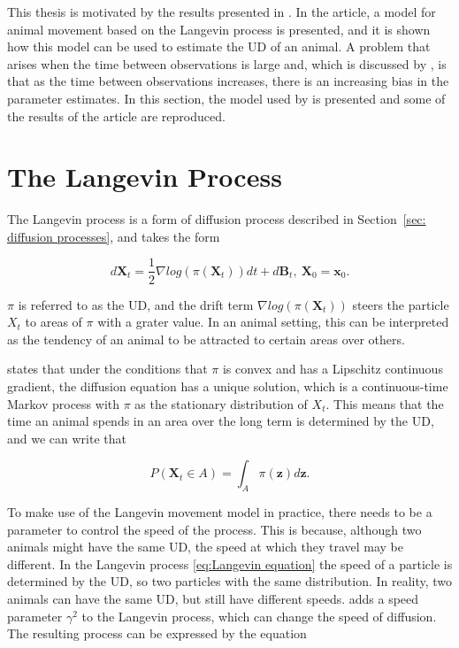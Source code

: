 
This thesis is motivated by the results presented in \parencite{michelot_langevin_2019}. In the article, a model for animal movement based on the Langevin process is presented, and it is shown how this model can be used to estimate the UD of an animal. A problem that arises when the time between observations is large and, which is discussed by \parencite{michelot_langevin_2019}, is that as the time between observations increases, there is an increasing bias in the parameter estimates. In this section, the model used by \parencite{michelot_langevin_2019} is presented and some of the results of the article are reproduced.



\section{The Langevin Process}
The Langevin process is a form of diffusion process described in Section~\ref{sec: diffusion processes}, and takes the form

\begin{equation}
    d\textbf{X}_t = \frac{1}{2} \nabla log(\pi(\textbf{X}_t))dt + d\textbf{B}_t, \ \textbf{X}_0 = \textbf{x}_0.
    \label{eq:Langevin equation}
\end{equation}


$\pi$ is referred to as the UD, and the drift term $\nabla log(\pi(\textbf{X}_t))$ steers the particle $X_t$ to areas of $\pi$ with a grater value. In an animal setting, this can be interpreted as the tendency of an animal to be attracted to certain areas over others.



\parencite{dalalyan_theoretical_2017} states that under the conditions that $\pi$ is convex and has a Lipschitz continuous gradient, the diffusion equation has a unique solution, which is a continuous-time Markov process with $\pi$ as the stationary distribution of $X_t$. This means that the time an animal spends in an area over the long term is determined by the UD, and we can write that

\begin{equation}
    P(\textbf{X}_t \in A ) = \int_A \pi(\textbf{z})d\textbf{z}.
\end{equation}


To make use of the Langevin movement model in practice, there needs to be a parameter to control the speed of the process. This is because, although two animals might have the same UD, the speed at which they travel may be different. In the Langevin process \eqref{eq:Langevin equation} the speed of a particle is determined by the UD, so two particles with the same distribution. In reality, two animals can have the same UD, but still have different speeds. \parencite{roberts_optimal_1998} adds a speed parameter $\gamma^2$ to the Langevin process, which can change the speed of diffusion. The resulting process can be expressed by the equation

